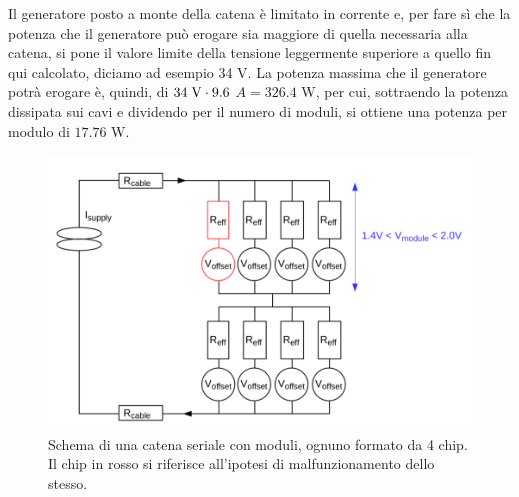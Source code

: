 Il generatore posto a monte della catena è limitato in corrente e, per fare sì che la potenza che il generatore può erogare sia maggiore di quella necessaria alla catena, si pone il valore limite della tensione leggermente superiore a quello fin qui calcolato, diciamo ad esempio 34 V.
La potenza massima che il generatore potrà erogare è, quindi, di $34 \rm \; V \cdot 9.6$ $A = 326.4$ W, per cui, sottraendo la potenza dissipata sui cavi e dividendo per il numero di moduli, si ottiene una potenza per modulo di $17.76$ W.

\begin{figure}
\centering
\includegraphics[scale=.3]{Immagini/MultiChipModules}
\caption{Schema di una catena seriale con moduli, ognuno formato da 4 chip. Il chip in rosso si riferisce all'ipotesi di malfunzionamento dello stesso.}
\label{MCM}
\end{figure}

